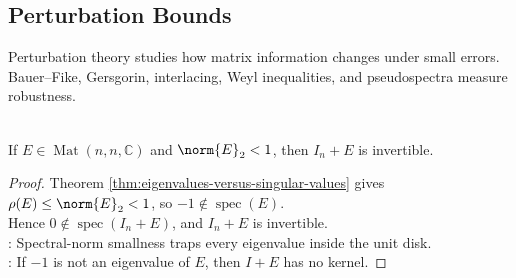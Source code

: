 \subsection{Perturbation Bounds}

%

Perturbation theory studies how matrix information changes under small errors. Bauer--Fike, Gersgorin, interlacing, Weyl inequalities, and pseudospectra measure robustness.

\begin{lemma} \label{lem:small-spectral-norm-perturbation-invertible} \\
If $E\in\operatorname{Mat}(n,n,\mathbb{C})$ and $\norm{E}_2<1$, then $I_n+E$ is invertible.
\begin{proof}
Theorem \ref{thm:eigenvalues-versus-singular-values} gives $\rho(E)\leq\norm{E}_2<1$, so $-1\notin\operatorname{spec}(E)$.\\
Hence $0\notin\operatorname{spec}(I_n+E)$, and $I_n+E$ is invertible.\\
: Spectral-norm smallness traps every eigenvalue inside the unit disk.\\
: If $-1$ is not an eigenvalue of $E$, then $I+E$ has no kernel.
\end{proof}
\end{lemma}


